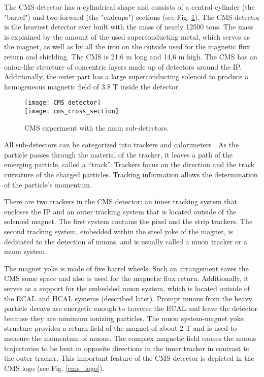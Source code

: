 \begin{normalsize}
The CMS detector has a cylindrical shape and consists of a central cylinder (the "barrel") and two forward (the "endcaps") sections (see Fig. \ref{CMS_detector}). 
The CMS detector is the heaviest detector ever built with the mass of nearly 12500 tons. The mass is explained by the amount of the used superconducting metal, which serves as the magnet, as well as by all the iron on the outside used for the magnetic flux return and shielding. The CMS is 21.6 m long and 14.6 m high. The CMS has an onion-like structure of concentric layers made up of detectors around the IP. Additionally, the outer part has a large superconducting solenoid to produce a homogeneous magnetic field of 3.8 T inside the detector.

\begin{figure}[H]
  \centering
  \texttt{[image: CMS\_detector]}\\
  \vspace{1cm}
  \texttt{[image: cms\_cross\_section]}
  \caption{CMS experiment with the main sub-detectors.}
  \label{CMS_detector}
\end{figure}

All sub-detectors can be categorized into trackers and calorimeters \cite{Hauptman:2011zza}. As the particle passes through the material of the tracker, it leaves a path of the emerging particle, called a ``track''. Trackers focus on the direction and the track curvature of the charged particles. Tracking information allows the determination of the particle's momentum. 

There are two trackers in the CMS detector: an inner tracking system that encloses the IP and an outer tracking system that is located outside of the solenoid magnet. The first system contains the pixel and the strip trackers. The second tracking system, embedded within the steel yoke of the magnet, is dedicated to the detection of muons, and is usually called a muon tracker or a muon system. 

The magnet yoke is made of five barrel wheels. Such an arrangement saves the CMS some space and also is used for the magnetic flux return. Additionally, it serves as a support for the embedded muon system, which is located outside of the ECAL and HCAL systems (described later). Prompt muons from the heavy particle decays are energetic enough to traverse the ECAL and leave the detector because they are minimum ionizing particles. The muon system-magnet yoke structure provides a return field of the magnet of about 2 T and is used to measure the momentum of muons. The complex magnetic field causes the muons trajectories to be bent in opposite directions in the inner tracker in contrast to the outer tracker. This important feature of the CMS detector is depicted in the CMS logo (see Fig. \ref{cms_logo}). 


\end{normalsize}
